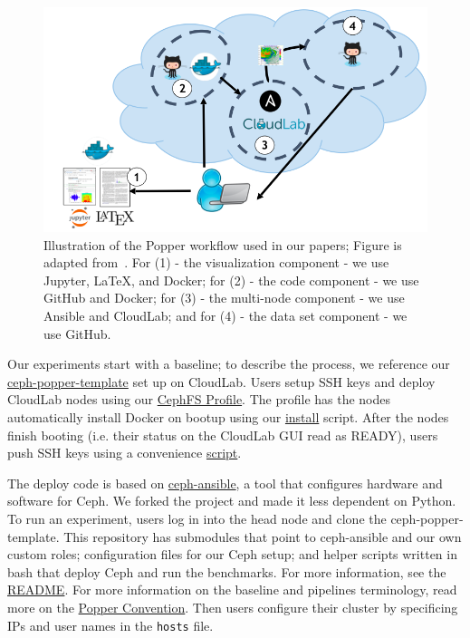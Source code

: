 \begin{figure}[tb] 
  \centering
  \includegraphics[width=1\linewidth]{./figures/workflow.png}
  \caption{Illustration of the Popper workflow used in our papers; Figure is
adapted from~\cite{jimenez:ipdpsw17-popper}. For (1) - the visualization
component - we use Jupyter, \LaTeX, and Docker; for (2) - the code component -
we use GitHub and Docker; for (3) - the multi-node component - we use Ansible
and CloudLab; and for (4) - the data set component - we use GitHub.}
  \label{fig:workflow}
\end{figure}

Our experiments start with a baseline; to describe the process, we reference
our
\href{https://github.com/michaelsevilla/ceph-popper-template}{ceph-popper-template}
set up on CloudLab. Users setup SSH keys and deploy CloudLab nodes using our
\href{https://www.cloudlab.us/p/CephFS/CephFS-HEP}{CephFS Profile}.  The
profile has the nodes automatically install Docker on bootup using our
\href{https://github.com/michaelsevilla/ceph-popper-template/blob/master/hardware/cloudlab/install.sh}{install}
script. After the nodes finish booting (i.e.  their status on the CloudLab GUI
read as READY), users push SSH keys using a convenience
\href{https://raw.githubusercontent.com/michaelsevilla/ceph-popper-template/master/hardware/cloudlab/pushkeys.sh}{script}.

The deploy code is based on
\href{https://github.com/ceph/ceph-ansible/wiki}{ceph-ansible}, a tool that
configures hardware and software for Ceph. We forked the project and made it
less dependent on Python. To run an experiment, users log in into the head node
and clone the ceph-popper-template. This repository has submodules that point
to ceph-ansible and our own custom roles; configuration files for our Ceph
setup; and helper scripts written in bash that deploy Ceph and run the
benchmarks. For more information, see the
\href{https://github.com/michaelsevilla/ceph-popper-template}{README}. For more
information on the baseline and pipelines terminology, read more on the
\href{http://falsifiable.us/}{Popper Convention}. Then users configure their
cluster by specificing IPs and user names in the \texttt{hosts} file. 

